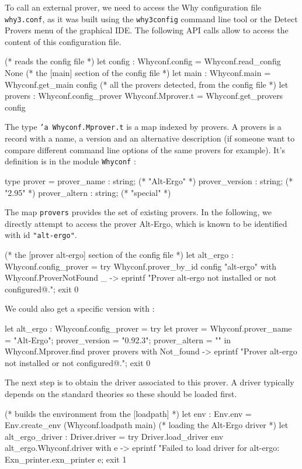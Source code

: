 To call an external prover, we need to access the Why configuration
file \texttt{why3.conf}, as it was built using the \texttt{why3config}
command line tool or the \textsf{Detect Provers} menu of the graphical
IDE. The following API calls allow to access the content of this
configuration file.
\begin{ocamlcode}
(* reads the config file *)
let config : Whyconf.config = Whyconf.read_config None
(* the [main] section of the config file *)
let main : Whyconf.main = Whyconf.get_main config
(* all the provers detected, from the config file *)
let provers : Whyconf.config_prover Whyconf.Mprover.t =
  Whyconf.get_provers config
\end{ocamlcode}
The type \texttt{'a Whyconf.Mprover.t} is a map indexed by provers. A
provers is a record with a name, a version and an alternative description
(if someone want to compare different command line options of the same
provers for example). It's definition is in the module
\texttt{Whyconf} :
\begin{ocamlcode}
type prover =
    { prover_name : string; (* "Alt-Ergo" *)
      prover_version : string; (* "2.95" *)
      prover_altern : string; (* "special" *)
    }
\end{ocamlcode}
The map \texttt{provers} provides the set of existing provers.
In the following, we directly
attempt to access the prover Alt-Ergo, which is known to be identified
with id \texttt{"alt-ergo"}.
\begin{ocamlcode}
(* the [prover alt-ergo] section of the config file *)
let alt_ergo : Whyconf.config_prover =
  try
    Whyconf.prover_by_id config "alt-ergo"
  with Whyconf.ProverNotFound _ ->
    eprintf "Prover alt-ergo not installed or not configured@.";
    exit 0
\end{ocamlcode}
We could also get a specific version with :
\begin{ocamlcode}
let alt_ergo : Whyconf.config_prover =
  try
    let prover = {Whyconf.prover_name = "Alt-Ergo";
                  prover_version = "0.92.3";
                  prover_altern = ""} in
    Whyconf.Mprover.find prover provers
  with Not_found ->
    eprintf "Prover alt-ergo not installed or not configured@.";
    exit 0
\end{ocamlcode}

The next step is to obtain the driver associated to this prover. A
driver typically depends on the standard theories so these should be
loaded first.
\begin{ocamlcode}
(* builds the environment from the [loadpath] *)
let env : Env.env =
  Env.create_env (Whyconf.loadpath main)
(* loading the Alt-Ergo driver *)
let alt_ergo_driver : Driver.driver =
  try
    Driver.load_driver env alt_ergo.Whyconf.driver
  with e ->
    eprintf "Failed to load driver for alt-ergo: %
      Exn_printer.exn_printer e;
    exit 1
\end{ocamlcode}

